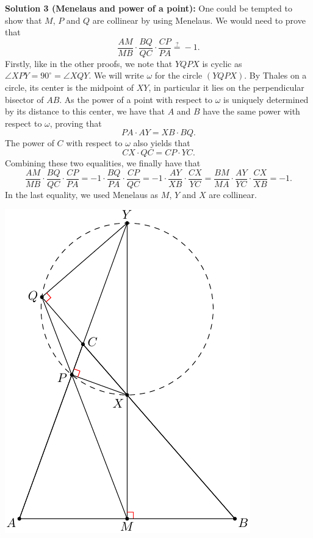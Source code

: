 {\textbf{Solution 3 (Menelaus and power of a point):} One could be tempted to show that $M$, $P$ and $Q$ are collinear by using Menelaus. We would need to prove that 
\[
\frac{AM}{MB}\cdot \frac{BQ}{QC}\cdot \frac{CP}{PA}\stackrel{?}{=}-1.
\]
Firstly, like in the other proofs, we note that $YQPX$ is cyclic as $\angle XPY=90^\circ=\angle XQY$. We will write $\omega$ for the circle $(YQPX)$. By Thales on a circle, its center is the midpoint of $XY$, in particular it lies on the perpendicular bisector of $AB$. As the power of a point with respect to $\omega$ is uniquely determined by its distance to this center, we have that $A$ and $B$ have the same power with respect to $\omega$, proving that 
\[
PA\cdot AY=XB\cdot BQ.
\]
The power of $C$ with respect to $\omega$ also yields that
\[
CX\cdot QC=CP\cdot YC.
\]
Combining these two equalities, we finally have that
\[
\frac{AM}{MB}\cdot \frac{BQ}{QC}\cdot \frac{CP}{PA}=-1\cdot \frac{BQ}{PA}\cdot \frac{CP}{QC}=-1\cdot \frac{AY}{XB}\cdot \frac{CX}{YC} =\frac{BM}{MA}\cdot \frac{AY}{YC}\cdot \frac{CX}{XB}=-1.
\]
In the last equality, we used Menelaus as $M$, $Y$ and $X$ are collinear.
\begin{center}
\includegraphics{g2fig}
\end{center}

\bigskip

}
